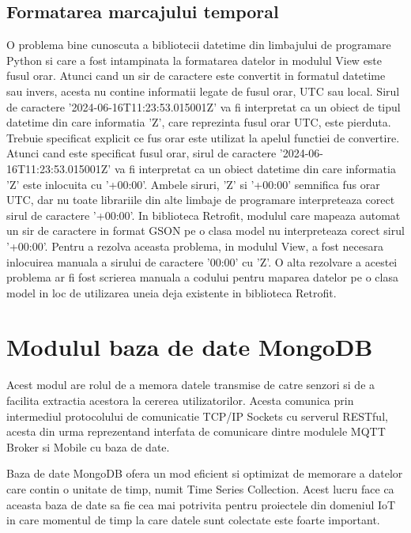 \subsection{Formatarea marcajului temporal}\label{subsec:pi_restserver_timestamp}
O problema bine cunoscuta a bibliotecii datetime din limbajului de programare Python si care a fost intampinata la formatarea datelor in modulul View este fusul orar. 
Atunci cand un sir de caractere este convertit in formatul datetime sau invers, acesta nu contine informatii legate de fusul orar, UTC sau local. Sirul de caractere 
'2024-06-16T11:23:53.015001Z' va fi interpretat ca un obiect de tipul datetime din care informatia 'Z', care reprezinta fusul orar UTC, este pierduta. 
Trebuie specificat explicit ce fus orar este utilizat la apelul functiei de convertire. Atunci cand este specificat fusul orar, sirul de caractere 
'2024-06-16T11:23:53.015001Z' va fi interpretat ca un obiect datetime din care informatia 'Z' este inlocuita cu '+00:00'. Ambele siruri, 'Z' si '+00:00' semnifica fus orar 
UTC, dar nu toate librariile din alte limbaje de programare interpreteaza corect sirul de caractere '+00:00'. In biblioteca Retrofit, modulul care mapeaza automat un sir de 
caractere in format GSON pe o clasa model nu interpreteaza corect sirul '+00:00'. Pentru a rezolva aceasta problema, in modulul View, a fost necesara inlocuirea manuala a sirului 
de caractere '00:00' cu 'Z'. O alta rezolvare a acestei problema ar fi fost scrierea manuala a codului pentru maparea datelor pe o clasa model in loc de utilizarea uneia deja 
existente in biblioteca Retrofit. 

\section{Modulul baza de date MongoDB}\label{sec:pi_bazadedate}
Acest modul are rolul de a memora datele transmise de catre senzori si de a facilita extractia acestora la cererea utilizatorilor. Acesta comunica prin intermediul 
protocolului de comunicatie TCP/IP Sockets cu serverul RESTful, acesta din urma reprezentand interfata de comunicare dintre modulele MQTT Broker si Mobile cu baza 
de date. 

Baza de date MongoDB ofera un mod eficient si optimizat de memorare a datelor care contin o unitate de timp, numit Time Series Collection. Acest lucru face ca aceasta 
baza de date sa fie cea mai potrivita pentru proiectele din domeniul IoT in care momentul de timp la care datele sunt colectate este foarte important.


